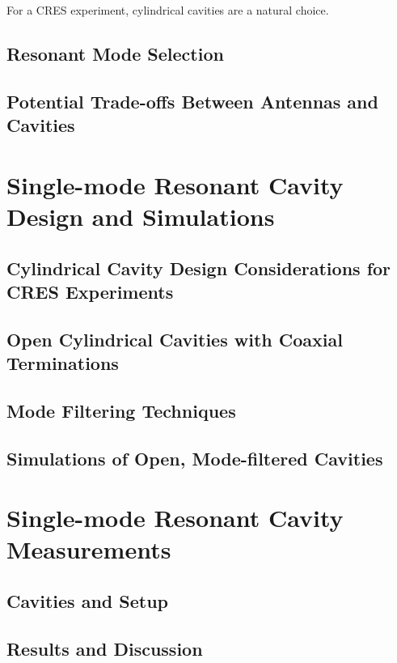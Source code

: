 For a CRES experiment, cylindrical cavities are a natural choice.

\subsection{Resonant Mode Selection}

\subsection{Potential Trade-offs Between Antennas and Cavities}

\section{Single-mode Resonant Cavity Design and Simulations}
\label{sec:chap6-single-mode-cavity-sims}

\subsection{Cylindrical Cavity Design Considerations for CRES Experiments}

\subsection{Open Cylindrical Cavities with Coaxial Terminations}

\subsection{Mode Filtering Techniques}

\subsection{Simulations of Open, Mode-filtered Cavities}

\section{Single-mode Resonant Cavity Measurements}
\label{sec:chap6-single-mode-cavity-measurement}

\subsection{Cavities and Setup}

\subsection{Results and Discussion}

